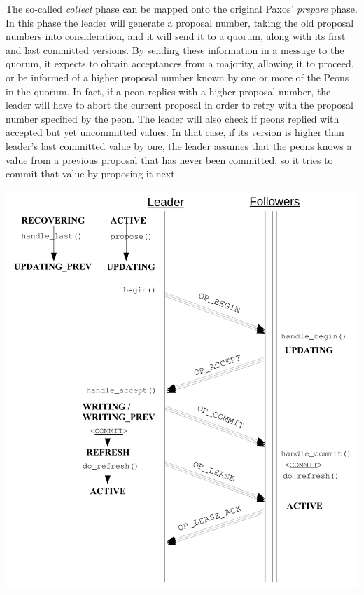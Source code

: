 \documentclass{article}
\begin{document}
The so-called \textit{collect} phase can be mapped onto the original Paxos' \textit{prepare} phase.
In this phase the leader will generate a proposal number, taking the old proposal numbers into consideration, 
and it will send it to a quorum, along with its first and last committed versions.
By sending these information in a message to the quorum, it expects to
obtain acceptances from a majority, allowing it to proceed, 
or be informed of a higher proposal number known by one or more of the Peons in the quorum.
In fact, if a peon replies with a higher proposal number, the leader will have to abort the current
proposal in order to retry with the proposal number specified by the peon.
The leader will also check if peons replied with accepted but
yet uncommitted values. In that case, if its version is higher than leader's
last committed value by one, the leader assumes that the peons knows a value from a
previous proposal that has never been committed, so it tries to commit that value by proposing it next.

\begin{center}
	\includegraphics[scale=0.60]{figs/paxos_seq.pdf}
	\label{fig:paxosseq}
\end{center}
\end{document}
